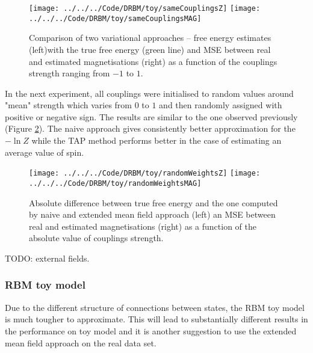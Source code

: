 \documentclass[../report/report.tex]{subfiles}
\begin{document}
\begin{figure}[!htb]
%
 \texttt{[image: ../../../Code/DRBM/toy/sameCouplingsZ]}
\endminipage 
{}  
 \texttt{[image: ../../../Code/DRBM/toy/sameCouplingsMAG]}
\endminipage\hfill
  \caption[1]{Comparison of two  variational approaches -- free energy estimates (left)with the true free energy (green line) and MSE between real and estimated magnetisations (right) as a function of the couplings strength ranging from $-1$ to $1$.}
  \label{fig:gridModel}
\end{figure}

In the next experiment, all couplings were initialised to random values around "mean" strength which varies from $0$ to $1$ and then randomly assigned with positive or negative sign. The results are similar to the one observed previously (Figure \ref{fig:gridModelCoup}). The naive approach gives consistently better approximation for the $-\ln Z$ while the TAP method performs better in the case of estimating an average value of spin. 

\begin{figure}[!htb]
%
 \texttt{[image: ../../../Code/DRBM/toy/randomWeightsZ]}
\endminipage 
{}  
 \texttt{[image: ../../../Code/DRBM/toy/randomWeightsMAG]}
\endminipage\hfill
  \caption[1]{Absolute difference between true free energy and the one computed by naive and extended mean field approach (left) an MSE between real and estimated magnetisations (right) as a function of the absolute value of couplings strength.}
  \label{fig:gridModelCoup}
\end{figure}

TODO: external fields.

\subsubsection{RBM toy model}
Due to the different structure of connections between states, the RBM toy model is much tougher to approximate. This will lead to substantially different results in the performance on toy model and it is another suggestion to use the extended mean field approach on the real data set.
\end{document}
